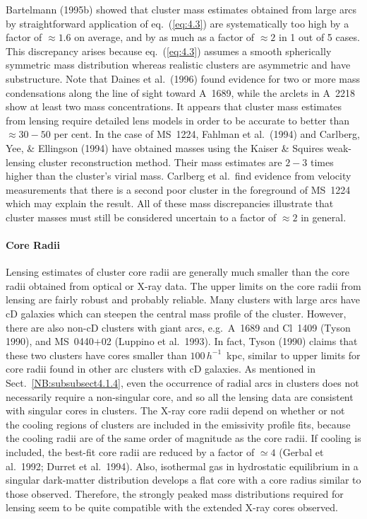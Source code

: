 \documentclass[a4paper,10pt]{article} %
\begin{document}
Bartelmann (1995b) showed that cluster mass estimates obtained from
large arcs by straightforward application of eq.\ (\ref{eq:4.3}) are
systematically too high by a factor of $\approx1.6$ on average, and by
as much as a factor of $\approx2$ in 1 out of 5 cases. This
discrepancy arises because eq.\ (\ref{eq:4.3}) assumes a smooth
spherically symmetric mass distribution whereas realistic clusters are
asymmetric and have substructure. Note that Daines et al.\ (1996)
found evidence for two or more mass condensations along the line of
sight toward A~1689, while the arclets in A~2218 show at least two
mass concentrations. It appears that cluster mass estimates from
lensing require detailed lens models in order to be accurate to better
than $\approx30-50$ per cent. In the case of MS~1224, Fahlman et al.\
(1994) and Carlberg, Yee, \& Ellingson (1994) have obtained masses
using the Kaiser \& Squires weak-lensing cluster reconstruction
method. Their mass estimates are $2-3$ times higher than the cluster's
virial mass. Carlberg et al.\ find evidence from velocity measurements
that there is a second poor cluster in the foreground of MS~1224 which
may explain the result. All of these mass discrepancies illustrate
that cluster masses must still be considered uncertain to a factor of
$\approx2$ in general.

\paragraph{Core Radii}

Lensing estimates of cluster core radii are generally much smaller
than the core radii obtained from optical or X-ray data. The upper
limits on the core radii from lensing are fairly robust and probably
reliable. Many clusters with large arcs have cD galaxies which can
steepen the central mass profile of the cluster. However, there are
also non-cD clusters with giant arcs, e.g.\ A~1689 and Cl~1409 (Tyson
1990), and MS~0440$+$02 (Luppino et al.\ 1993). In fact, Tyson (1990)
claims that these two clusters have cores smaller than
$100\,h^{-1}$~kpc, similar to upper limits for core radii found in
other arc clusters with cD galaxies. As mentioned in Sect.\
\ref{NB:subsubsect4.1.4}, even the occurrence of radial arcs in
clusters does not necessarily require a non-singular core, and so all
the lensing data are consistent with singular cores in clusters. The
X-ray core radii depend on whether or not the cooling regions of
clusters are included in the emissivity profile fits, because the
cooling radii are of the same order of magnitude as the core radii. If
cooling is included, the best-fit core radii are reduced by a factor
of $\simeq4$ (Gerbal et al.\ 1992; Durret et al.\ 1994). Also,
isothermal gas in hydrostatic equilibrium in a singular dark-matter
distribution develops a flat core with a core radius similar to those
observed. Therefore, the strongly peaked mass distributions required
for lensing seem to be quite compatible with the extended X-ray cores
observed.
\end{document}
